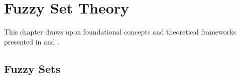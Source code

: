 \chapter{Fuzzy Set Theory}
\label{ch:FStheory}
This chapter draws upon foundational concepts and theoretical frameworks presented in \cite{FULLER1} and \cite{FULLER2}. 

\section{Fuzzy Sets}

% 
% 
% 
% 
% 

% 